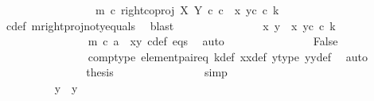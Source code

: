 \begin{isabellebody}
\ \ \ \ \ \ \ \ \ \ \ \ \ \ \ \ \ m\ {\isasymcirc}\isactrlsub c\ right{\isacharunderscore}{\kern0pt}coproj\ X\ Y\ {\isasymcirc}\isactrlsub c\ c\ {\isacharequal}{\kern0pt}\ {\isasymlangle}x{}{\isacharcomma}{\kern0pt}\ y{}\isactrlsup c\ {\isasymcirc}\isactrlsub c\ k{\isasymrangle}{\isachardoublequoteclose}\isanewline
\ \ \ \ \ \ \ \ \ \ \ \ \ \ \isamarkupfalse%
\ c{\isacharunderscore}{\kern0pt}def\ m{\isacharunderscore}{\kern0pt}rightproj{\isacharunderscore}{\kern0pt}not{\isacharunderscore}{\kern0pt}y{}{\isacharunderscore}{\kern0pt}equals\ \isamarkupfalse%
\ blast\isanewline
\ \ \ \ \ \ \ \ \ \ \ \ \isamarkupfalse%
\ \isamarkupfalse%
\ {\isachardoublequoteopen}{\isasymlangle}x{}{\isacharcomma}{\kern0pt}\ y{}{\isasymrangle}\ {\isacharequal}{\kern0pt}\ {\isasymlangle}x{}{\isacharcomma}{\kern0pt}\ y{}\isactrlsup c\ {\isasymcirc}\isactrlsub c\ k{\isasymrangle}{\isachardoublequoteclose}\isanewline
\ \ \ \ \ \ \ \ \ \ \ \ \ \ \isamarkupfalse%
\ {\isacartoucheopen}m\ {\isasymcirc}\isactrlsub c\ a\ {\isacharequal}{\kern0pt}\ {\isasymlangle}x{}{\isacharcomma}{\kern0pt}y{}{\isasymrangle}{\isacartoucheclose}\ c{\isacharunderscore}{\kern0pt}def\ eqs\ \isamarkupfalse%
\ auto\isanewline
\ \ \ \ \ \ \ \ \ \ \ \ \isamarkupfalse%
\ \isamarkupfalse%
\ False\isanewline
\ \ \ \ \ \ \ \ \ \ \ \ \ \ \isamarkupfalse%
\ comp{\isacharunderscore}{\kern0pt}type\ element{\isacharunderscore}{\kern0pt}pair{\isacharunderscore}{\kern0pt}eq\ k{\isacharunderscore}{\kern0pt}def\ x{}x{}{\isacharunderscore}{\kern0pt}def\ y{}{\isacharprime}{\kern0pt}{\isacharunderscore}{\kern0pt}type\ y{}y{}{\isacharunderscore}{\kern0pt}def{\isacharparenleft}{\kern0pt}{}{\isacharparenright}{\kern0pt}\ \isamarkupfalse%
\ auto\isanewline
\ \ \ \ \ \ \ \ \ \ \ \ \isamarkupfalse%
\ \isamarkupfalse%
\ {\isacharquery}{\kern0pt}thesis\isanewline
\ \ \ \ \ \ \ \ \ \ \ \ \ \ \isamarkupfalse%
\ simp\isanewline
\ \ \ \ \ \ \ \ \ \ \isamarkupfalse%
\isanewline
\ \ \ \ \ \ \ \ \isamarkupfalse%
\isanewline
\ \ \ \ \ \ \isamarkupfalse%
\isanewline
\ \ \ \ \ \ \ \ \isamarkupfalse%
\ {\isachardoublequoteopen}y\ {\isasymnoteq}\ y{}{\isachardoublequoteclose}\isanewline

\end{isabellebody}
